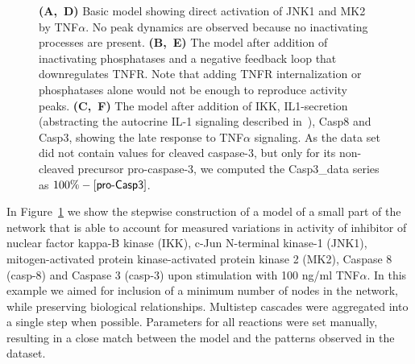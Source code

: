 \documentclass{bmcart}
\begin{document}
\begin{figure}[!htbp]
{{\bf(A,~D)} %
Basic model showing direct activation of JNK1 and MK2 by TNF$\alpha$.
No peak dynamics are observed because no inactivating processes are present.
{\bf(B,~E)} %
The model after addition of inactivating phosphatases and a negative feedback loop that downregulates TNFR. Note that adding TNFR internalization or phosphatases alone would not be enough to reproduce activity peaks.
{\bf(C,~F)} %
The model after addition of IKK, IL1-secretion (abstracting
the autocrine IL-1 signaling described in~\cite{pathway-autocrine}), Casp8 and Casp3, showing the late response to TNF$\alpha$ signaling.
As the data set did not contain values for cleaved caspase-3, but only for its non-cleaved precursor pro-caspase-3,
we computed the {\sf Casp3\_{}data} series as $100\% - [\mbox{\sf pro-Casp3}]$.\label{fig:small-model}}
\end{figure}


In Figure~\ref{fig:small-model} we show the stepwise construction of a model of a small part of the network that is
able to account for measured variations in activity of inhibitor of nuclear factor kappa-B kinase (IKK), c-Jun N-terminal kinase-1 (JNK1),
mitogen-activated protein kinase-activated protein kinase 2 (MK2), Caspase 8 (casp-8) and Caspase 3 (casp-3) upon stimulation with 100
ng/ml TNF$\alpha$. In this example we aimed for inclusion of a minimum number of nodes in the network, while preserving biological relationships.
Multistep cascades were aggregated into a single step when possible. Parameters for all reactions were set manually, resulting in a close
match between the model and the patterns observed in the dataset.











\end{document}
